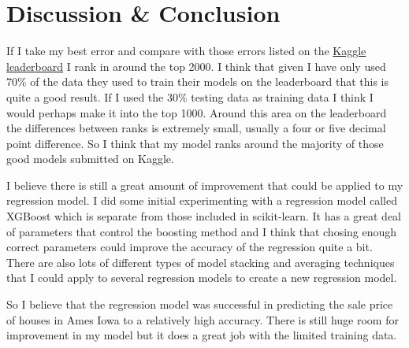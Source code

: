 \documentclass[a4paper]{article}
\begin{document}
\section{Discussion \& Conclusion}
If I take my best error and compare with those errors listed on the \href{https://www.kaggle.com/c/house-prices-advanced-regression-techniques/leaderboard}{Kaggle leaderboard} I rank in around the top 2000. I think that given I have only used 70\% of the data they used to train their models on the leaderboard that this is quite a good result. If I used the 30\% testing data as training data I think I would perhaps make it into the top 1000. Around this area on the leaderboard the differences between ranks is extremely small, usually a four or five decimal point difference. So I think that my model ranks around the majority of those good models submitted on Kaggle.
\par I believe there is still a great amount of improvement that could be applied to my regression model. I did some initial experimenting with a regression model called XGBoost which is separate from those included in scikit-learn. It has a great deal of parameters that control the boosting method and I think that chosing enough correct parameters could improve the accuracy of the regression quite a bit. There are also lots of different types of model stacking and averaging techniques that I could apply to several regression models to create a new regression model.
\par So I believe that the regression model was successful in predicting the sale price of houses in Ames Iowa to a relatively high accuracy. There is still huge room for improvement in my model but it does a great job with the limited training data. 
\end{document}
